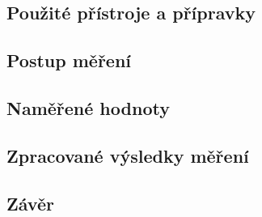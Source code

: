 \documentclass{protokol}
\begin{document}
    \subsection{Použité přístroje a přípravky}
    \subsection{Postup měření}
    \subsection{Naměřené hodnoty}
    \subsection{Zpracované výsledky měření}
    \subsection{Závěr}

\pagebreak



\end{document}
